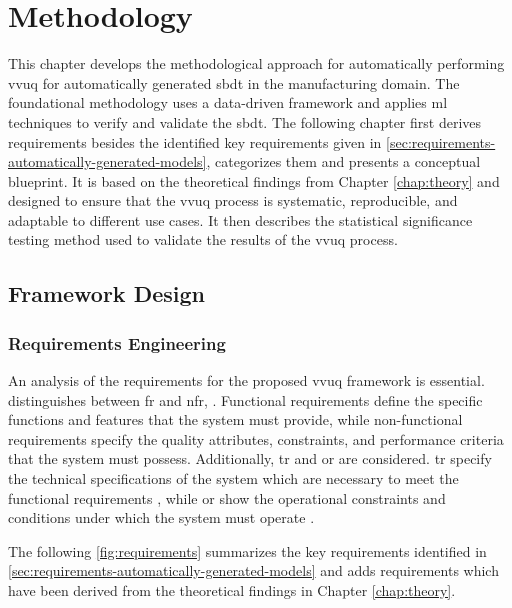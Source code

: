 \chapter{Methodology}
\label{chap:methodology}
This chapter develops the methodological approach for automatically performing \gls{vvuq} for automatically generated \gls{sbdt} in the manufacturing domain. The foundational methodology uses a data-driven framework and applies \gls{ml} techniques to verify and validate the \gls{sbdt}. The following chapter first derives requirements besides the identified key requirements given in \autoref{sec:requirements-automatically-generated-models}, categorizes them and presents a conceptual blueprint. It is based on the theoretical findings from Chapter \ref{chap:theory} and designed to ensure that the \gls{vvuq} process is systematic, reproducible, and adaptable to different use cases. It then describes the statistical significance testing method used to validate the results of the \gls{vvuq} process.

\section{Framework Design}
\subsection{Requirements Engineering}
An analysis of the requirements for the proposed \gls{vvuq} framework is essential. \Textcite{sindhgatta2005functional} distinguishes between \gls{fr} \textcite{van2001goal} and \gls{nfr}, \textcite{glinz2005rethinking}. Functional requirements define the specific functions and features that the system must provide, while non-functional requirements specify the quality attributes, constraints, and performance criteria that the system must possess. Additionally, \gls{tr} and \gls{or} are considered. \gls{tr} specify the technical specifications of the system which are necessary to meet the functional requirements \autocite{chikh2012new}, while \gls{or} show the operational constraints and conditions under which the system must operate \autocite{incose2023incose}.

The following \autoref{fig:requirements} summarizes the key requirements identified in \autoref{sec:requirements-automatically-generated-models} and adds requirements which have been derived from the theoretical findings in Chapter \ref{chap:theory}.


